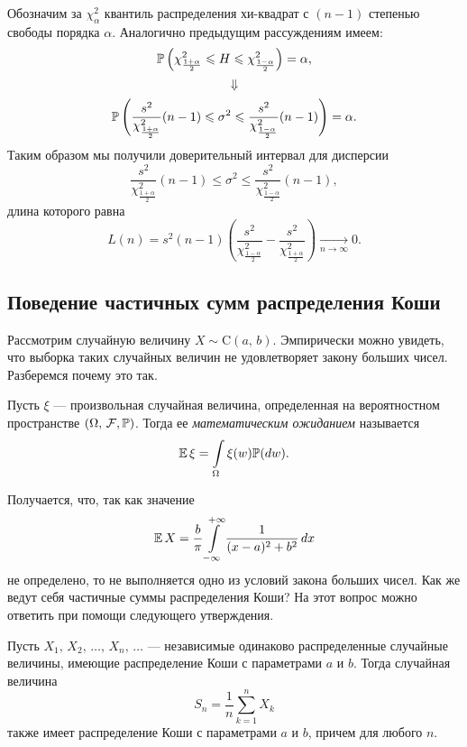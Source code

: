 Обозначим за $\chi^2_{\alpha}$ квантиль распределения хи-квадрат с $(n-1)$ степенью свободы порядка $\alpha$. Аналогично предыдущим рассуждениям имеем:
$$
        \mathbb{P}\left(\chi^2_{\frac{1 + \alpha}{2}} \leqslant H \leqslant \chi^2_{\frac{1 - \alpha}{2}}\right) = \alpha,
$$
$$
        \Downarrow
$$
$$
        \mathbb{P}\left(
                \frac{s^2}{\chi^2_{\frac{1 + \alpha}{2}}}
                (n - 1)
                \leqslant
                \sigma^2
                \leqslant
                \frac{s^2}{\chi^2_{\frac{1 - \alpha}{2}}}
                (n - 1)
        \right) = \alpha.
$$
Таким образом мы получили доверительный интервал для дисперсии
$$
        \frac{s^2}{\chi^2_{\frac{1 + \alpha}{2}}}
        (n - 1)
        \leqslant
        \sigma^2
        \leqslant
        \frac{s^2}{\chi^2_{\frac{1 - \alpha}{2}}}
        (n - 1),
$$
длина которого равна
$$
        L(n) = s^2 (n - 1) \left(
                \frac{s^2}{\chi^2_{\frac{1 - \alpha}{2}}}
                -
                \frac{s^2}{\chi^2_{\frac{1 + \alpha}{2}}}
        \right) \xrightarrow[n\to\infty]{} 0.
$$


\subsection{Поведение частичных сумм распределения Коши}

Рассмотрим случайную величину $X \sim \mbox{C}(a,\,b)$. Эмпирически можно увидеть, что выборка таких случайных величин не удовлетворяет закону больших чисел. Разберемся почему это так.

\begin{definition}
        Пусть $\xi$ --- произвольная случайная величина, определенная на вероятностном пространстве $(\Omega,\, \mathcal{F}, \mathbb{P})$. Тогда ее \textit{математическим ожиданием} называется
$$
        \mathbb{E}\,\xi = \int\limits_{\Omega}\xi(w)\mathbb{P}(dw).
$$
\end{definition}

Получается, что, так как значение
$$
        \mathbb{E}\,X =
        \frac{b}{\pi}
        \int\limits_{-\infty}^{+\infty} \frac{1}{(x - a)^2 + b^2}\,dx
$$
не определено, то не выполняется одно из условий закона больших чисел. Как же ведут себя частичные суммы распределения Коши? На этот вопрос можно ответить при помощи следующего утверждения.

\begin{assertion}
        Пусть $X_1,\,X_2,\,\ldots,\,X_n,\,\ldots$ --- независимые одинаково распределенные случайные величины, имеющие распределение Коши с параметрами $a$ и $b$. Тогда случайная величина
$$
        S_n = \frac 1 n \sum_{k = 1}^n X_k
$$
        также имеет распределение Коши с параметрами $a$ и $b$, причем для любого $n$.
\end{assertion}

